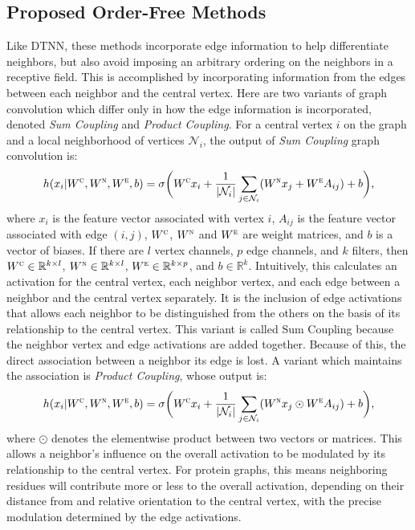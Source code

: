 \subsection{Proposed Order-Free Methods}
Like DTNN, these methods incorporate edge information to help differentiate neighbors, but also avoid imposing an arbitrary ordering on the neighbors in a receptive field.
This is accomplished by incorporating information from the edges between each neighbor and the central vertex.
Here are two variants of graph convolution which differ only in how the edge information is incorporated, denoted \textit{Sum Coupling} and \textit{Product Coupling}.
For a central vertex $i$ on the graph and a local neighborhood of vertices $\mathcal{N}_i$, the output of \emph{Sum Coupling} graph convolution is:
\begin{equation}
h(x_i | W^\textsc{c}, W^\textsc{n}, W^\textsc{e}, b) = \sigma \bigg( W^{\textsc{c}} x_i + \frac{1}{|\mathcal{N}_i|}\sum_{j \in \mathcal{N}_i} (W^{\textsc{n}} x_j + W^{\textsc{e}} A_{ij}) + b \bigg),
\label{eq:sum_coupling}
\end{equation}
where $x_i$ is the feature vector associated with vertex $i$, $A_{ij}$ is the feature vector associated with edge $(i, j)$, $W^\textsc{c}$, $W^\textsc{n}$ and $W^\textsc{e}$ are weight matrices, and $b$ is a vector of biases. 
If there are $l$ vertex channels, $p$ edge channels, and $k$ filters, then $W^\textsc{c}\in\mathbb{R}^{k \times l}$, $W^\textsc{n}\in\mathbb{R}^{k \times l}$, $W^\textsc{e}\in\mathbb{R}^{k \times p}$, and $b\in\mathbb{R}^{k}$.
Intuitively, this calculates an activation for the central vertex, each neighbor vertex, and each edge between a neighbor and the central vertex separately.
It is the inclusion of edge activations that allows each neighbor to be distinguished from the others on the basis of its relationship to the central vertex.
This variant is called Sum Coupling because the neighbor vertex and edge activations are added together.
Because of this, the direct association between a neighbor its edge is lost.
A variant which maintains the association is \emph{Product Coupling}, whose output is:
\begin{equation}
h(x_i | W^\textsc{c}, W^\textsc{n}, W^\textsc{e}, b) = \sigma \bigg( W^{\textsc{c}} x_i + \frac{1}{|\mathcal{N}_i|}\sum_{j \in \mathcal{N}_i} (W^{\textsc{n}} x_j \odot W^{\textsc{e}} A_{ij}) + b \bigg),
\label{eq:prod_coupling}
\end{equation}
where $\odot$ denotes the elementwise product between two vectors or matrices. 
This allows a neighbor's influence on the overall activation to be modulated by its relationship to the central vertex.
For protein graphs, this means neighboring residues will contribute more or less to the overall activation, depending on their distance from and relative orientation to the central vertex, with the precise modulation determined by the edge activations.

